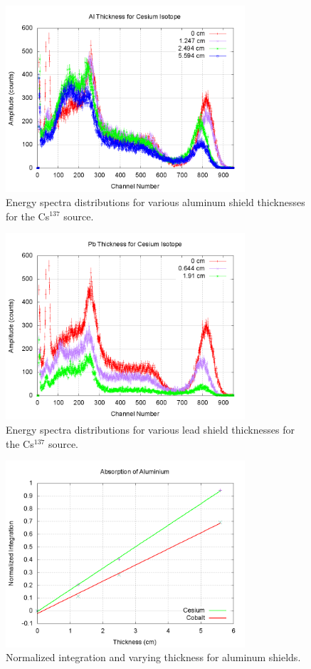 \documentclass[aps,prl,twocolumn,superscriptaddress,nofootinbib]{revtex4-1}
\begin{document}
\vfill\eject
\begin{figure}[h!]
  \begin{center}
\centerline{\includegraphics[width=3.5in]{csthickal.png}}
\caption{ \small{Energy spectra distributions for various aluminum shield thicknesses for the Cs$^{137}$ source. \label{fig9}}}
  \end{center}
\end{figure}

\begin{figure}[h!]
  \begin{center}
\centerline{\includegraphics[width=3.5in]{csthickpb.png}}
\caption{ \small{Energy spectra distributions for various lead shield thicknesses for the Cs$^{137}$ source. \label{fig10}}}
  \end{center}
\end{figure}
\vfill\eject
\begin{figure}[h!]
  \begin{center}
\centerline{\includegraphics[width=3.5in]{muAl.png}}
\caption{ \small{Normalized integration and varying thickness for aluminum shields. \label{fig11}}}
  \end{center}
\end{figure}
\end{document}
